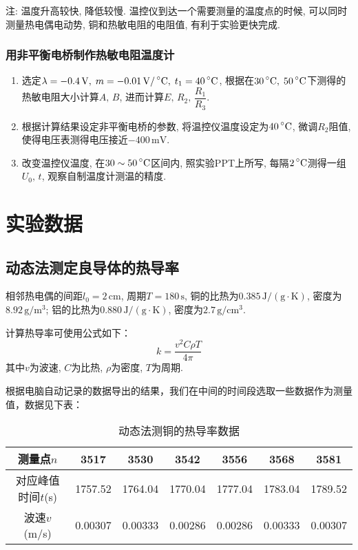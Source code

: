\documentclass[11pt]{article}
\newcommand*{\unit}[1]{\mathop{}\!\mathrm{#1}}
\newcommand*{\mcelsius}{\unit{\prescript{\circ}{}C}}
\begin{document}
注: 温度升高较快, 降低较慢. 温控仪到达一个需要测量的温度点的时候, 可以同时测量热电偶电动势, 铜和热敏电阻的电阻值, 有利于实验更快完成.

\subsubsection{用非平衡电桥制作热敏电阻温度计}

\begin{enumerate}
    
  \item 选定$ \lambda = -0.4\,\mathrm{V},\; m=-0.01\,\mathrm{V/\mcelsius},\; t_1=40\mcelsius $, 根据在$ 30\mcelsius,\;50\mcelsius $下测得的热敏电阻大小计算$ A,\,B $, 进而计算$ E,\,R_2,\,\dfrac{R_1}{R_3} $.

  \item 根据计算结果设定非平衡电桥的参数, 将温控仪温度设定为$ 40\mcelsius $, 微调$ R_2 $阻值, 使得电压表测得电压接近$ -400\,\mathrm{mV} $. 

  \item 改变温控仪温度, 在$ 30\sim 50\mcelsius $区间内, 照实验PPT上所写, 每隔$ 2\mcelsius $测得一组$ U_0,\,t $, 观察自制温度计测温的精度. 

\end{enumerate}

\section{实验数据}

\subsection{动态法测定良导体的热导率}

相邻热电偶的间距$ l_0=2\,\mathrm{cm} $, 周期$ T=180\,\mathrm{s} $, 铜的比热为$ 0.385\,\mathrm{J/(g\cdot K)} $, 密度为$ 8.92\,\mathrm{g/m^3} $; 铝的比热为$ 0.880\,\mathrm{J/(g\cdot K)} $, 密度为$ 2.7\,\mathrm{g/cm^3} $.

计算热导率可使用公式如下：
\[
    k = \frac{v^2C\rho T}{4\pi}
\]
其中$ v $为波速, $ C $为比热, $ \rho $为密度, $ T $为周期.

根据电脑自动记录的数据导出的结果，我们在中间的时间段选取一些数据作为测量值，数据见下表：

\begin{table}[H]
  \centering
  \caption{动态法测铜的热导率数据}
  \begin{tabular}{|c|c|c|c|c|c|c|}
      \hline
      测量点$n$&3517  & 3530  & 3542  & 3556  & 3568  & 3581 \\
      \hline
      对应峰值时间$t$(s)&1757.52 & 1764.04 & 1770.04 & 1777.04 & 1783.04 & 1789.52 \\
      \hline
      波速$v$(m/s)&0.00307 & 0.00333 & 0.00286 & 0.00286 & 0.00333 & 0.00307 \\
      \hline
  \end{tabular}
\end{table}
\end{document}
